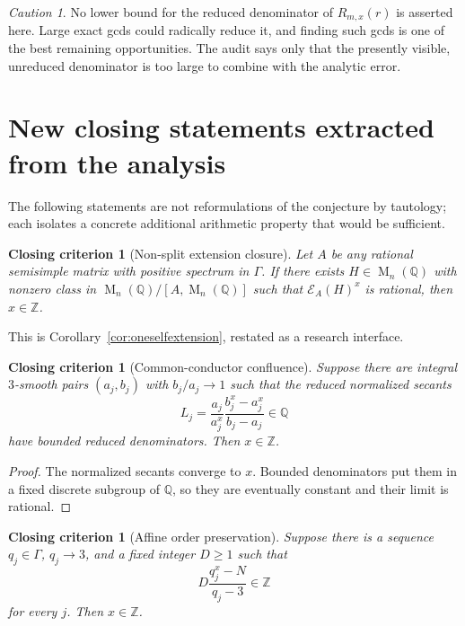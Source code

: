 \documentclass[11pt,oneside]{article}
\newtheorem{criterion}[theorem]{Closing criterion}
\theoremstyle{definition}
\theoremstyle{remark}
\newtheorem{warning}[theorem]{Caution}
\newcommand{\Z}{\mathbb Z}
\newcommand{\Q}{\mathbb Q}
\newcommand{\Mat}{\operatorname{M}}
\newcommand{\cE}{\mathcal E}
\begin{document}
\begin{warning}
No lower bound for the reduced denominator of $R_{m,x}(r)$ is asserted here.  Large exact gcds
could radically reduce it, and finding such gcds is one of the best remaining opportunities.
The audit says only that the presently visible, unreduced denominator is too large to combine
with the analytic error.
\end{warning}

\section{New closing statements extracted from the analysis}
\label{sec:closingstatements}

The following statements are not reformulations of the conjecture by tautology; each isolates
a concrete additional arithmetic property that would be sufficient.

\begin{criterion}[Non-split extension closure]
\label{crit:nonsplit}
Let $A$ be any rational semisimple matrix with positive spectrum in $\Gamma$.  If there exists
$H\in\Mat_n(\Q)$ with nonzero class in
$\Mat_n(\Q)/[A,\Mat_n(\Q)]$ such that
$\cE_A(H)^x$ is rational, then $x\in\Z$.
\end{criterion}

This is Corollary~\ref{cor:oneselfextension}, restated as a research interface.

\begin{criterion}[Common-conductor confluence]
\label{crit:commonconductor}
Suppose there are integral $3$-smooth pairs $(a_j,b_j)$ with $b_j/a_j\to1$ such that the
reduced normalized secants
\begin{equation}
 L_j=\frac{a_j}{a_j^x}\frac{b_j^x-a_j^x}{b_j-a_j}
 \in\Q
 \label{eq:normalizedsecant}
\end{equation}
have bounded reduced denominators.  Then $x\in\Z$.
\end{criterion}

\begin{proof}
The normalized secants converge to $x$.  Bounded denominators put them in a fixed discrete
subgroup of $\Q$, so they are eventually constant and their limit is rational.
\end{proof}

\begin{criterion}[Affine order preservation]
\label{crit:affineorder}
Suppose there is a sequence $q_j\in\Gamma$, $q_j\to3$, and a fixed integer $D\ge1$ such that
\begin{equation}
 D\frac{q_j^x-N}{q_j-3}\in\Z
 \label{eq:affineD}
\end{equation}
for every $j$.  Then $x\in\Z$.
\end{criterion}
\end{document}
